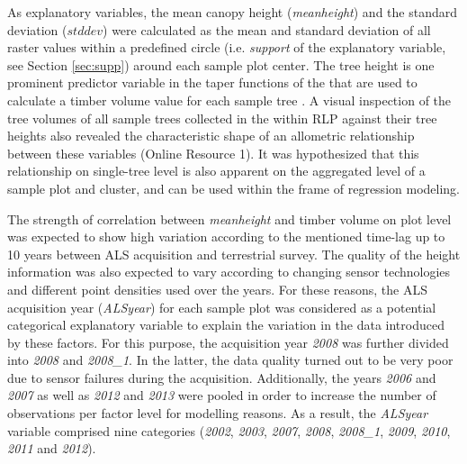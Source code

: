 As explanatory variables, the mean canopy height (\textit{meanheight}) and the standard deviation ($stddev$) were calculated as the mean and standard deviation of all raster values within a predefined circle (i.e. \textit{support} of the explanatory variable, see Section \ref{sec:supp}) around each sample plot center.  The tree height is one prominent predictor variable in the taper functions of the \bwi{} that are used to calculate a timber volume value for each sample tree \citep{kublin2003, kublin2013}. A visual inspection of the tree volumes of all sample trees collected in the \bwi{} within RLP against their tree heights also revealed the characteristic shape of an allometric relationship between these variables (Online Resource 1). It was hypothesized that this relationship on single-tree level is also apparent on the aggregated level of a sample plot and cluster, and can be used within the frame of regression modeling.\par
The strength of correlation between \textit{meanheight} and timber volume on plot level was expected to show high variation according to the mentioned time-lag up to 10 years between ALS acquisition and terrestrial survey. The quality of the height information was also expected to vary according to changing sensor technologies and different point densities used over the years. For these reasons, the ALS acquisition year (\textit{ALSyear}) for each sample plot was considered as a potential categorical explanatory variable to explain the variation in the data introduced by these factors. For this purpose, the acquisition year \textit{2008} was further divided into \textit{2008} and \textit{2008\_1}. In the latter, the data quality turned out to be very poor due to sensor failures during the acquisition. Additionally, the years \textit{2006} and \textit{2007} as well as \textit{2012} and \textit{2013} were pooled in order to increase the number of observations per factor level for modelling reasons. As a result, the \textit{ALSyear} variable comprised nine categories (\textit{2002}, \textit{2003}, \textit{2007}, \textit{2008}, \textit{2008\_1}, \textit{2009}, \textit{2010}, \textit{2011} and \textit{2012}).

